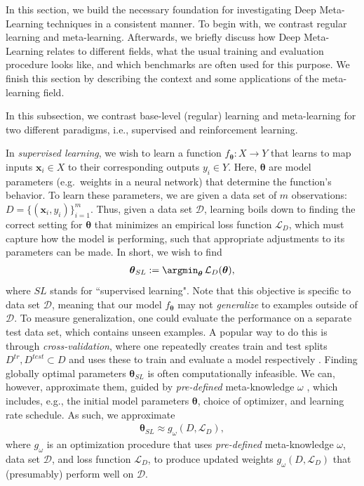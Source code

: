 \label{sec:foundation}
In this section, we build the necessary foundation for investigating Deep Meta-Learning techniques in a consistent manner. To begin with, we contrast regular learning and meta-learning. Afterwards, we briefly discuss how Deep Meta-Learning relates to different fields, what the usual training and evaluation procedure looks like, and which benchmarks are often used for this purpose. We finish this section by describing the context and some applications of the meta-learning field.

In this subsection, we contrast base-level (regular) learning and meta-learning for two different paradigms, i.e., supervised and reinforcement learning.

In \textit{supervised learning}, we wish to learn a function $f_{\boldsymbol{\theta}}: X \rightarrow Y$ that learns to map inputs $\boldsymbol{x}_{i} \in X$ to their corresponding outputs $y_{i} \in Y$. Here, $\boldsymbol{\theta}$ are model parameters (e.g.\ weights in a neural network) that determine the function's behavior. To learn these parameters, we are given a data set of $m$ observations: $D = \{(\boldsymbol{x}_{i}, y_{i})\}_{i=1}^{m}$. Thus, given a data set $\mathcal{D}$, learning boils down to finding the correct setting for $\boldsymbol{\theta}$ that minimizes an empirical loss function $\mathcal{L}_{D}$, which must capture how the model is performing, such that appropriate adjustments to its parameters can be made. In short, we wish to find 
\begin{align}
    \boldsymbol{\theta}_{SL} := \argmin_{\boldsymbol{\theta}} \, \mathcal{L}_{D}(\boldsymbol{\theta}),
\end{align}\label{eq:suplearning}where $SL$ stands for ``supervised learning". Note that this objective is specific to data set $\mathcal{D}$, meaning that our model $f_{\boldsymbol{\theta}}$ may not \textit{generalize} to examples outside of $\mathcal{D}$. To measure generalization, one could evaluate the performance on a separate test data set, which contains unseen examples. A popular way to do this is through \textit{cross-validation}, where one repeatedly creates train and test splits $D^{tr}, D^{test} \subset D$ and uses these to train and evaluate a model respectively . 
Finding globally optimal parameters $\boldsymbol{\theta}_{SL}$ is often computationally infeasible. We can, however, approximate them,  guided by \textit{pre-defined} meta-knowledge $\omega$ , which includes, e.g., the initial model parameters $\boldsymbol{\theta}$, choice of optimizer, and learning rate schedule. As such, we approximate 
\begin{align}
    \boldsymbol{\theta}_{SL} \approx g_{\omega}(D, \mathcal{L}_{D}),
\end{align}
where $g_{\omega}$ is an optimization procedure that uses \textit{pre-defined} meta-knowledge $\omega$, data set $\mathcal{D}$, and loss function $\mathcal{L}_{D}$, to produce updated weights $g_{\omega}(D, \mathcal{L}_{D})$ that (presumably) perform well on $\mathcal{D}$.

